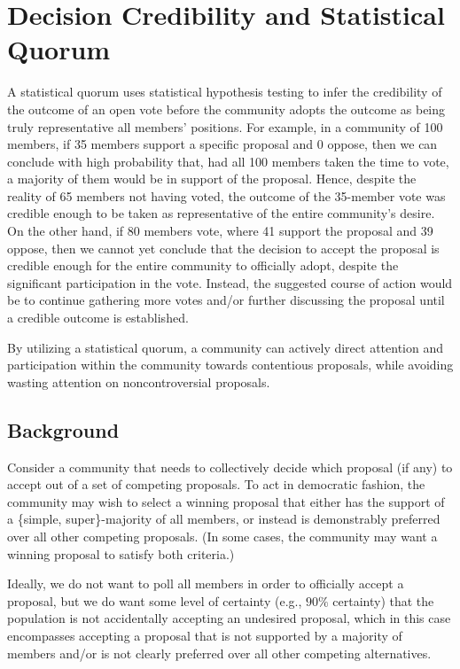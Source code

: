 \documentclass[chi_draft]{sigchi}
\begin{document}
\section{Decision Credibility and Statistical Quorum}
\label{sec:decision-credibility}
A statistical quorum uses statistical hypothesis testing to infer the credibility of the outcome of an open vote before the community adopts the outcome as being truly representative all members' positions.
For example, in a community of 100 members, if 35 members support a specific proposal and 0 oppose, then we can conclude with high probability that, had all 100 members taken the time to vote, a majority of them would be in support of the proposal.  Hence, despite the reality of 65 members not having voted, the outcome of the 35-member vote was credible enough to be taken as representative of the entire community's desire.
On the other hand, if 80 members vote, where 41 support the proposal and 39 oppose, then we cannot yet conclude that the decision to accept the proposal is credible enough for the entire community to officially adopt, despite the significant participation in the vote.
Instead, the suggested course of action would be to continue gathering more votes and/or further discussing the proposal until a credible outcome is established.

By utilizing a statistical quorum, a community can actively direct attention and participation within the community towards contentious proposals, while avoiding wasting attention on noncontroversial proposals.

\subsection{Background}
Consider a community that needs to collectively decide which proposal (if any) to accept out of a set of competing proposals.
To act in democratic fashion, the community may wish to select a winning proposal that either has the support of a \{simple, super\}-majority of all members, or instead is demonstrably preferred over all other competing proposals.  (In some cases, the community may want a winning proposal to satisfy both criteria.)

Ideally, we do not want to poll all members in order to officially accept a proposal, but we do want some level of certainty (e.g., $90\%$ certainty) that
the population is not accidentally accepting an undesired proposal, which in this case encompasses accepting a proposal that is not supported by a majority of members and/or is not clearly preferred over all other competing alternatives.
\end{document}
